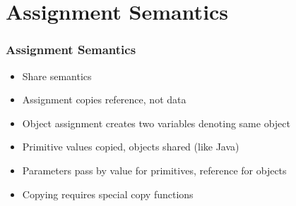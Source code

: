 \documentclass[trans,compress,xcolor=table]{beamer}
\begin{document}
\section{Assignment Semantics}
\begin{frame}
\frametitle{Assignment Semantics}
\begin{itemize}
\item Share semantics
\item Assignment copies reference, not data
\item Object assignment creates two variables denoting
	same object
\item Primitive values copied, objects shared (like Java)
\item Parameters pass by value for primitives, reference for
	objects
\item Copying requires special copy functions
\end{itemize}
\end{frame}
\end{document}

